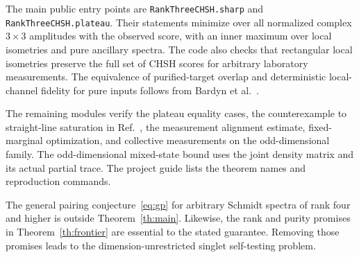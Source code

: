 \documentclass[11pt]{article}
\begin{document}
The main public entry points are \texttt{RankThreeCHSH.sharp} and \texttt{RankThreeCHSH.plateau}. Their statements minimize over all normalized complex $3\times3$ amplitudes with the observed score, with an inner maximum over local isometries and pure ancillary spectra. The code also checks that rectangular local isometries preserve the full set of CHSH scores for arbitrary laboratory measurements. The equivalence of purified-target overlap and deterministic local-channel fidelity for pure inputs follows from Bardyn et al.~\cite[App.~B]{bardyn}.

The remaining modules verify the plateau equality cases, the counterexample to straight-line saturation in Ref.~\cite{mckague}, the measurement alignment estimate, fixed-marginal optimization, and collective measurements on the odd-dimensional family. The odd-dimensional mixed-state bound uses the joint density matrix and its actual partial trace. The project guide lists the theorem names and reproduction commands.

The general pairing conjecture~\eqref{eq:gp} for arbitrary Schmidt spectra of rank four and higher is outside Theorem~\ref{th:main}. Likewise, the rank and purity promises in Theorem~\ref{th:frontier} are essential to the stated guarantee. Removing those promises leads to the dimension-unrestricted singlet self-testing problem.
\end{document}
